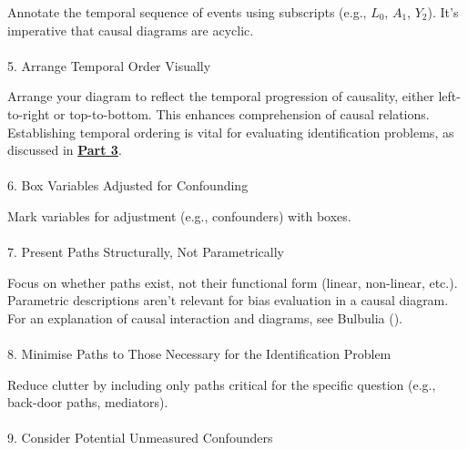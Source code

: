 \documentclass[
  singlecolumn]{article}
\makeatletter
\let\oldparagraph\paragraph
\renewcommand{\paragraph}{
    \@ifstar
      \xxxParagraphStar
      \xxxParagraphNoStar
  }
\newcommand{\xxxParagraphStar}[1]{\oldparagraph*{#1}\mbox{}}
\newcommand{\xxxParagraphNoStar}[1]{\oldparagraph{#1}\mbox{}}
\makeatother
\begin{document}
Annotate the temporal sequence of events using subscripts (e.g.,
\(L_0\), \(A_1\), \(Y_2\)). It's imperative that causal diagrams are
acyclic.

\paragraph{5. Arrange Temporal Order
Visually}\label{arrange-temporal-order-visually}

Arrange your diagram to reflect the temporal progression of causality,
either left-to-right or top-to-bottom. This enhances comprehension of
causal relations. Establishing temporal ordering is vital for evaluating
identification problems, as discussed in
\hyperref[sec-part3]{\textbf{Part 3}}.

\paragraph{6. Box Variables Adjusted for
Confounding}\label{box-variables-adjusted-for-confounding}

Mark variables for adjustment (e.g., confounders) with boxes.

\paragraph{7. Present Paths Structurally, Not
Parametrically}\label{present-paths-structurally-not-parametrically}

Focus on whether paths exist, not their functional form (linear,
non-linear, etc.). Parametric descriptions aren't relevant for bias
evaluation in a causal diagram. For an explanation of causal interaction
and diagrams, see Bulbulia ().

\paragraph{8. Minimise Paths to Those Necessary for the Identification
Problem}\label{minimise-paths-to-those-necessary-for-the-identification-problem}

Reduce clutter by including only paths critical for the specific
question (e.g., back-door paths, mediators).

\paragraph{9. Consider Potential Unmeasured
Confounders}\label{consider-potential-unmeasured-confounders}
\end{document}
